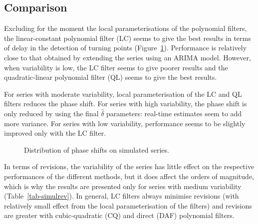\documentclass[
]{article}
\newcommand\1{\mathds{1}}
\begin{document}
\subsection{Comparison}\label{comparison}

Excluding for the moment the local parameterisations of the polynomial
filters, the linear-constant polynomial filter (LC) seems to give the
best results in terms of delay in the detection of turning points
(Figure~\ref{fig-graphstpsimul}). Performance is relatively close to
that obtained by extending the series using an ARIMA model. However,
when variability is low, the LC filter seems to give poorer results and
the quadratic-linear polynomial filter (QL) seems to give the best
results.

For series with moderate variability, local parameterisation of the LC
and QL filters reduces the phase shift. For series with high
variability, the phase shift is only reduced by using the final
\(\hat\delta\) parameters: real-time estimates seem to add more
variance. For series with low variability, performance seems to be
slightly improved only with the LC filter.

\begin{figure}[H]

\caption{\label{fig-graphstpsimul}Distribution of phase shifts on
simulated series.}


\end{figure}%

In terms of revisions, the variability of the series has little effect
on the respective performances of the different methods, but it does
affect the orders of magnitude, which is why the results are presented
only for series with medium variability (Table~\ref{tab-simulrev}). In
general, LC filters always minimise revisions (with relatively small
effect from the local parameterisation of the filters) and revisions are
greater with cubic-quadratic (CQ) and direct (DAF) polynomial filters.
\end{document}
